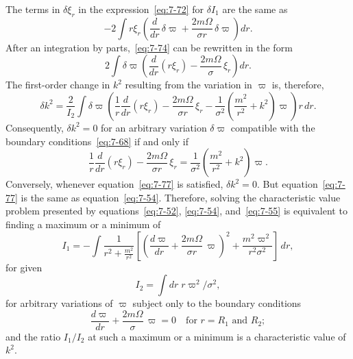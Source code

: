 The terms in $\delta\xi_r$ in the expression~\eqref{eq:7-72} for $\delta I_1$ are the same as
\begin{equation}
\label{eq:7-74}
-2\int r\xi_r\!\left(\frac{d}{dr}\,\delta\varpi+\frac{2m\Omega}{\sigma r}\,\delta\varpi\right)dr.
\end{equation}
After an integration by parts,~\eqref{eq:7-74} can be rewritten in the form
\begin{equation}
\label{eq:7-75}
2\int \delta\varpi\!\left(\frac{d}{dr}(r\xi_r)
- \frac{2m\Omega}{\sigma}\,\xi_r\right) dr.
\end{equation}
The first-order change in $k^2$ resulting from the variation in $\varpi$ is, therefore,
\begin{equation}
\label{eq:7-76}
\delta k^2 = \frac{2}{I_2}\int \delta\varpi\!\left(
\frac{1}{r}\frac{d}{dr}(r\xi_r)
- \frac{2m\Omega}{\sigma r}\,\xi_r
- \frac{1}{\sigma^2}\!\left(\frac{m^2}{r^2}+k^2\right)\varpi
\right)r\,dr.
\end{equation}
Consequently, $\delta k^2 = 0$ for an arbitrary variation $\delta\varpi$ compatible with
the boundary conditions~\eqref{eq:7-68} if and only if
\begin{equation}
\label{eq:7-77}
\frac{1}{r}\frac{d}{dr}(r\xi_r)
- \frac{2m\Omega}{\sigma r}\,\xi_r
= \frac{1}{\sigma^2}\!\left(\frac{m^2}{r^2}+k^2\right)\varpi.
\end{equation}
Conversely, whenever equation~\eqref{eq:7-77} is satisfied, $\delta k^2 = 0$.  But equation~\eqref{eq:7-77} is the same as equation~\eqref{eq:7-54}.  Therefore, solving the characteristic
value problem presented by equations~\eqref{eq:7-52}, \eqref{eq:7-54}, and~\eqref{eq:7-55} is equivalent
to finding a maximum or a minimum of
\begin{equation}
\label{eq:7-78}
I_1 = -\int \frac{1}{r^2 + \frac{m^2}{r^2}}\!\left[
\!\left(\frac{d\varpi}{dr}+\frac{2m\Omega}{\sigma r}\,\varpi\right)^{\!2}
+ \frac{m^2\varpi^2}{r^2\sigma^2}\right]\,dr,
\end{equation}
for given
\begin{equation}
\label{eq:7-79}
I_2 = \int dr\; r\varpi^2/\sigma^2,
\end{equation}
for arbitrary variations of $\varpi$ subject only to the boundary conditions
\begin{equation}
\label{eq:7-80}
\frac{d\varpi}{dr}+\frac{2m\Omega}{\sigma}\,\varpi = 0
\quad \text{for } r = R_1 \text{ and } R_2;
\end{equation}
and the ratio $I_1/I_2$ at such a maximum or a minimum is a characteristic
value of $k^2$.


